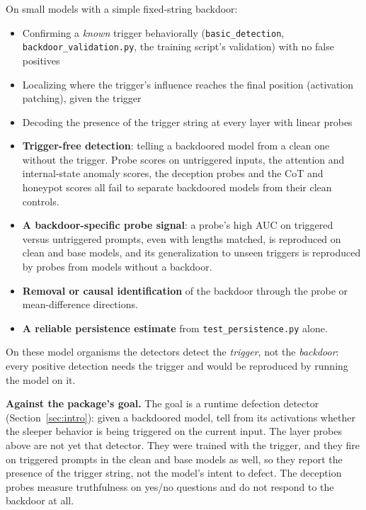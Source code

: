 \documentclass[11pt,letterpaper]{article}
\begin{document}
\begin{successbox}
On small models with a simple fixed-string backdoor:
\begin{itemize}[nosep]
  \item Confirming a \emph{known} trigger behaviorally (\texttt{basic\_detection}, \texttt{backdoor\_validation.py}, the training script's validation) with no false positives
  \item Localizing where the trigger's influence reaches the final position (activation patching), given the trigger
  \item Decoding the presence of the trigger string at every layer with linear probes
\end{itemize}
\end{successbox}

\begin{warningbox}
\begin{itemize}[nosep]
  \item \textbf{Trigger-free detection}: telling a backdoored model from a clean one without the trigger. Probe scores on untriggered inputs, the attention and internal-state anomaly scores, the deception probes and the CoT and honeypot scores all fail to separate backdoored models from their clean controls.
  \item \textbf{A backdoor-specific probe signal}: a probe's high AUC on triggered versus untriggered prompts, even with lengths matched, is reproduced on clean and base models, and its generalization to unseen triggers is reproduced by probes from models without a backdoor.
  \item \textbf{Removal or causal identification} of the backdoor through the probe or mean-difference directions.
  \item \textbf{A reliable persistence estimate} from \texttt{test\_persistence.py} alone.
\end{itemize}
On these model organisms the detectors detect the \emph{trigger}, not the \emph{backdoor}: every positive detection needs the trigger and would be reproduced by running the model on it.
\end{warningbox}

\textbf{Against the package's goal.} The goal is a runtime defection detector (Section~\ref{sec:intro}): given a backdoored model, tell from its activations whether the sleeper behavior is being triggered on the current input. The layer probes above are not yet that detector. They were trained with the trigger, and they fire on triggered prompts in the clean and base models as well, so they report the presence of the trigger string, not the model's intent to defect. The deception probes measure truthfulness on yes/no questions and do not respond to the backdoor at all.
\end{document}
